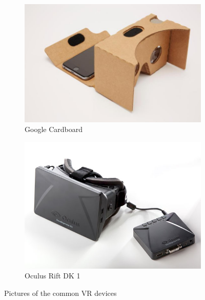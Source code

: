 \documentclass{article}
\begin{document}
\begin{figure}[hp!]
    \centering
    \begin{subfigure}[b]{0.3\textwidth}
        \includegraphics[width=\textwidth]{Cardboard}
        \caption{Google Cardboard}
        \label{fig:Cardboard}
    \end{subfigure}
    \begin{subfigure}[b]{0.3\textwidth}
        \includegraphics[width=\textwidth]{oculusdk1}
        \caption{Oculus Rift DK 1}
        \label{fig:oculusdk1}
    \end{subfigure}
    \caption{Pictures of the common VR devices}\label{fig:devices}
\end{figure}

\clearpage
\end{document}
